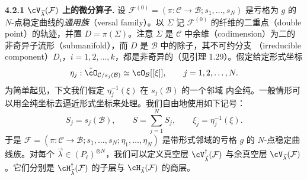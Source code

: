 \noindent\textbf{4.2.1 $\cV_{\vec{\lambda}}(\mathcal{F})$ 上的微分算子.}\quad
设 $\mathcal{F}^{(0)}=(\pi:\mathcal{C}\to\mathcal{B};s_1,\dots,s_N)$ 是亏格为
$g$ 的 $N$-点稳定曲线的\emph{通用族}（versal family）。以 $\Sigma$ 记
$\mathcal{F}^{(0)}$ 的纤维的二重点（double point）的轨迹，并置
$D=\pi(\Sigma)$。注意 $\Sigma$ 是 $\mathcal{C}$ 中余维（codimension）为二的
非奇异子流形（submanifold），而 $D$ 是 $\mathcal{B}$ 中的除子，其不可约分支
（irreducible component）$D_i$，$i=1,2,\dots,k$，都是非奇异的（见引理
1.29）。假定给定形式坐标
\[
  \eta_j : \hat{\cO}_{\mathcal{C}/s_j(\mathcal{B})}\simeq
  \cO_\mathcal{B}[[\xi]],\qquad j=1,2,\dots,N .
\]
为简单起见，下文我们假定 $\eta_j^{-1}(\xi)$ 在 $s_j(\mathcal{B})$ 的一个邻域
内全纯。一般情形可以用全纯坐标去逼近形式坐标来处理。我们自由地使用如下记号：
\[
  S_j=s_j(\mathcal{B}),\qquad S=\sum_{j=1}^NS_j,\qquad
  \xi_j=\eta_j^{-1}(\xi) .
\]
于是 $\mathcal{F}=(\pi:\mathcal{C}\to\mathcal{B};s_1,\dots,s_N;
\eta_1,\dots,\eta_N)$ 是带形式邻域的亏格 $g$ 的 $N$-点稳定曲线族。对每个
$\vec{\lambda}\in(P_\ell)^{\otimes N}$，我们可以定义真空层
$\cV_{\vec{\lambda}}^\dagger(\mathcal{F})$ 与余真空层
$\cV_{\vec{\lambda}}(\mathcal{F})$。它们分别是
$\cH_{\vec{\lambda}}^\dagger(\mathcal{F})$ 的子层与
$\cH_{\vec{\lambda}}(\mathcal{F})$ 的商层。

